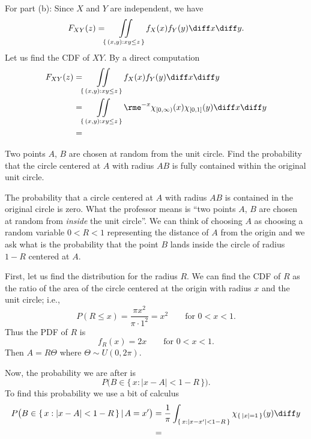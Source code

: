 \begin{solution}
  For part (b): Since \(X\) and \(Y\) are independent, we have
  \[
    F_{XY}(z)=\iint\limits_{\{\,(x,y):xy\leq z\,\}} f_X(x)f_Y(y)\diff x\diff y.
  \]
  Let us find the CDF of \(XY\). By a direct computation
  \begin{align*}
    F_{XY}(z)
    &=\iint\limits_{\{\,(x,y):xy\leq z\,\}} f_X(x)f_Y(y)\diff x\diff y\\
    &=\iint\limits_{\{\,(x,y):xy\leq z\,\}} \rme^{-x}\chi_{[0,\infty)}(x)\chi_{[0,1]}(y)
      \diff x\diff y\\
    &=
  \end{align*}
\end{solution}
\newpage

\begin{problem}[Handout 17, \# 18]
  Two points \(A\), \(B\) are chosen at random from the unit circle. Find
  the probability that the circle centered at \(A\) with radius \(AB\) is
  fully contained within the original unit circle.
\end{problem}
\begin{solution}
  The probability that a circle centered at \(A\) with radius \(AB\) is
  contained in the original circle is zero. What the professor means is
  ``two points \(A\), \(B\) are chosen at random from \emph{inside} the
  unit circle''. We can think of choosing \(A\) as choosing a random
  variable \(0<R<1\) representing the distance of \(A\) from the origin and
  we ask what is the probability that the point \(B\) lands inside the
  circle of radius \(1-R\) centered at \(A\).

  First, let us find the distribution for the radius \(R\). We can find the
  CDF of \(R\) as the ratio of the area of the circle centered at the
  origin with radius \(x\) and the unit circle; i.e.,
  \[
    P(R\leq x)=\frac{\pi x^2}{\pi\cdot 1^2}=x^2\qquad \text{for \(0<x<1\).}
  \]
  Thus the PDF of \(R\) is
  \[
    f_R(x)=2x\qquad\text{for \(0<x<1\).}
  \]
  Then \(A=R\Theta\) where \(\Theta\sim U(0,2\pi)\).

  Now, the probability we are after is
  \[
    P\bigl(B\in\{\,x:|x-A|<1-R\,\}\bigr).
  \]
  To find this probability we use a bit of calculus
  \begin{align*}
    P\bigl(B\in\{\,x:|x-A|<1-R\,\}\,|\,A=x'\bigr)
    &=\frac{1}{\pi}\int_{\{\,x:|x-x'|<1-R\,\}}\chi_{\{\,|x|=1\,\}}(y)\diff
      y\\
    &=
  \end{align*}
\end{solution}
\newpage

